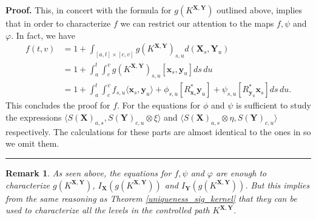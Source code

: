 \documentclass{article}%
\newtheorem{remark}[theorem]{Remark}
\newenvironment{proof}[1][Proof]{\noindent\textbf{#1.} }{\ \rule{0.5em}{0.5em}}
\begin{document}
\begin{proof}
This, in concert with the formula for $g\left(K^{\mathbf X,\mathbf Y}\right)$ outlined above, implies that in order to characterize $f$  we can restrict our attention to the maps
\(f, \psi\) and \(\varphi\). In fact, we have
\begin{align*}
    f(t,v) &= 1 + \int_{[a,t] \times [c,v]} g(K^{\mathbf{X}, \mathbf{Y}})_{s,u} d(\mathbf{X}_s, \mathbf{Y}_u)\\
    &= 1 + \int_a^t \int_c^v g(K^{\mathbf{X}, \mathbf{Y}})_{s,u} \left[ \boldsymbol{x}_s, \boldsymbol{y}_u\right] ds\, du\\
    &= 1+ \int_a^t \int_c^v f_{s,u} \langle \boldsymbol{x}_s, \boldsymbol{y}_u \rangle
+  \phi_{s,u}[R^*_{\boldsymbol{x}_s}  \boldsymbol{y}_u] 
+  \psi_{s,u}[R^*_{\boldsymbol{y}_u} \boldsymbol{x}_s] ds \, du.
\end{align*}
This concludes the proof for $f$.\newline
For the equations for $\phi$ and $\psi$ is sufficient to study the expressions $\langle S(\mathbf X)_{a,s} , S(\mathbf Y)_{c,u} \otimes \xi\rangle$ and $\langle S(\mathbf X)_{a,s} \otimes \eta, S(\mathbf Y)_{c,u}\rangle$ respectively. The calculations for these parts are almost identical to the ones in \cite{lemercier2024log} so we omit them.
\end{proof}

\begin{remark}
As seen above, the equations for $f, \psi$ and $\varphi$ are enough to characterize $g(K^{\mathbf{X}, \mathbf{Y}})$, $I_\mathbf{X}(g(K^{\mathbf{X}, \mathbf{Y}}))$ and $I_{\mathbf{Y}}(g(K^{\mathbf{X}, \mathbf{Y}}))$. But this implies from the same reasoning as Theorem \ref{uniqueness_sig_kernel} that they can be used to characterize all the levels in the controlled path $K^{\mathbf{X}, \mathbf{Y}}$.
\end{remark}

\end{document}
